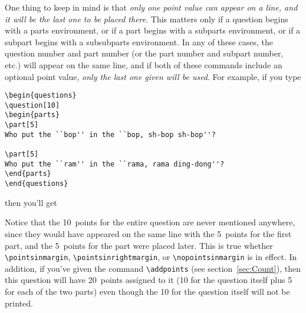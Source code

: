 \documentclass[12pt]{exam}
\begin{document}
One thing to keep in mind is that \emph{only one point value can
  appear on a line, and it will be the last one to be placed there}.
This matters only if a question begins with a parts environment, or if
a part begins with a subparts environment, or if a subpart begins with
a subsubparts environment.  In any of these cases, the question number
and part number (or the part number and subpart number, etc.) will
appear on the same line, and if both of these commands include an
optional point value, \emph{only the last one given will be used}.
For example, if you type
%
\begin{verbatim}
\begin{questions}
\question[10]
\begin{parts}
\part[5]
Who put the ``bop'' in the ``bop, sh-bop sh-bop''?

\part[5]
Who put the ``ram'' in the ``rama, rama ding-dong''?
\end{parts}
\end{questions}
\end{verbatim}
%
then you'll get
%
\noboxedpoints
\marginpointname{}
\begin{questions}
\question[10]
\end{questions}
%
Notice that the 10~points for the entire question are never mentioned
anywhere, since they would have appeared on the same line with the
5~points for the first part, and the 5~points for the part were placed
later.  This is true whether \verb"\pointsinmargin",
\verb"\pointsinrightmargin", or \verb"\nopointsinmargin" is in effect.
In addition, if you've given the command \verb"\addpoints" (see
section~\ref{sec:Count}), then this question will have 20~points
assigned to it (10 for the question itself plus 5 for each of the two
parts) even though the 10 for the question itself will not be printed.
\end{document}
